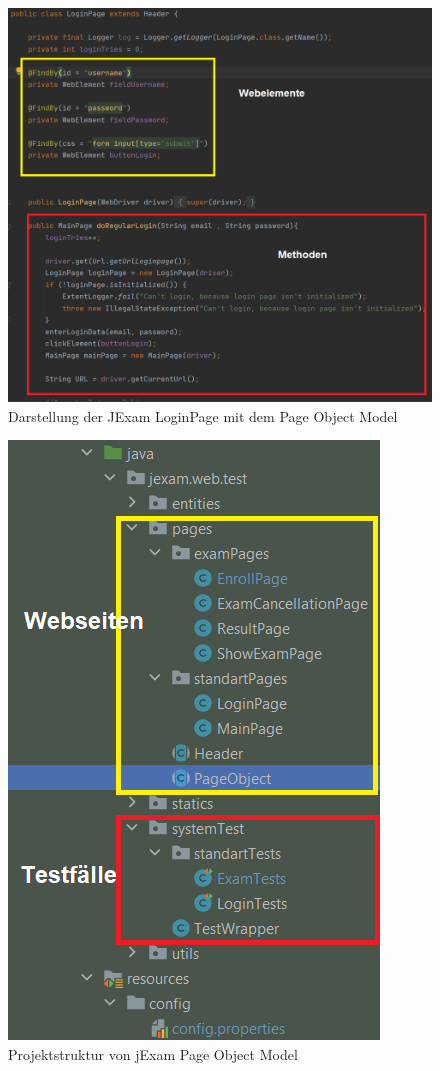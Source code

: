 \begin{figure}[H]
    \centering
    \includegraphics[scale=0.5]{images/page-example}
    \caption{Darstellung der JExam LoginPage mit dem Page Object Model} \label{fig:page-exp}
\end{figure}

\begin{figure}[H]
    \centering
    \includegraphics[scale=0.6]{images/page-object}
    \caption{Projektstruktur von jExam Page Object Model} \label{fig:page-obj}
\end{figure}
